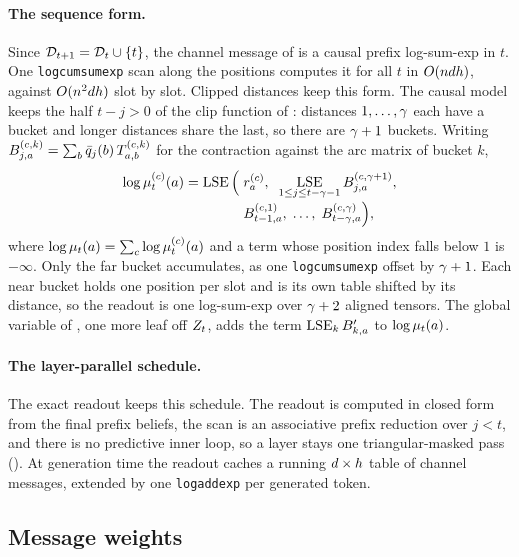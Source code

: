 \paragraph{The sequence form.}
Since $\mathcal{D}_{t+1} = \mathcal{D}_{t}\cup\{t\}$, the channel message of  is a causal prefix
log-sum-exp in $t$. One \texttt{logcumsumexp} scan along the positions computes it for all $t$
in $O(ndh)$, against $O(n^2dh)$ slot by slot. Clipped distances
keep this form. The causal model keeps the half $t-j>0$ of the clip function of
\citet{wu2023probabilistic}: distances $1,\dots,\gamma$ each have a bucket and longer distances
share the last, so there are $\gamma+1$ buckets. Writing
$B^{(c,k)}_{j,a} = \sum_b \bar{q}_{j}(b)\,T^{(c,k)}_{a,b}$ for the contraction against the arc
matrix of bucket $k$,
%
\begin{equation}
\label{eq:mu-scan}
\begin{aligned}
  \log\mu_{t}^{(c)}(a) = \operatorname*{LSE}\Big(\;&r^{(c)}_a,\;\;
      \operatorname*{LSE}_{1\le j\le t-\gamma-1} B^{(c,\gamma+1)}_{j,a},\\[-2pt]
    &B^{(c,1)}_{t-1,a},\;\dots,\;B^{(c,\gamma)}_{t-\gamma,a}\Big),
\end{aligned}
\end{equation}
%
where $\log\mu_{t}(a) = \sum_c \log\mu_{t}^{(c)}(a)$ and a term whose position index
falls below $1$ is $-\infty$. Only the far bucket accumulates, as one \texttt{logcumsumexp}
offset by $\gamma+1$. Each near bucket holds one position per slot and is its own table shifted
by its distance, so the readout is one log-sum-exp over $\gamma+2$ aligned tensors. The global
variable of , one more leaf off $Z_{t}$, adds the term
$\operatorname*{LSE}_k B'_{k,a}$ to $\log \mu_{t}(a)$.

\paragraph{The layer-parallel schedule.}
The exact readout keeps this schedule. The readout is computed in closed form from the final
prefix beliefs, the scan is an associative prefix reduction over $j<t$, and there is no
predictive inner loop, so a layer stays one triangular-masked pass (). At
generation time the readout caches a running $d \times h$ table of channel messages,
extended by one \texttt{logaddexp} per generated token.

\subsection{Message weights}
\label{app:message-weights}

